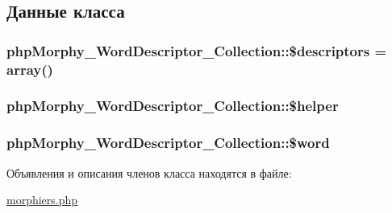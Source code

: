 \subsection{Данные класса}
\hypertarget{classphpMorphy__WordDescriptor__Collection_a9809563bf571bc19b2b13eecfd8e8017}{
\subsubsection[{\$descriptors}]{\setlength{\rightskip}{0pt plus 5cm}phpMorphy\_\-WordDescriptor\_\-Collection::\$descriptors = array()}}
\label{classphpMorphy__WordDescriptor__Collection_a9809563bf571bc19b2b13eecfd8e8017}
\hypertarget{classphpMorphy__WordDescriptor__Collection_ab5db98053fa20be5134c60341a0cbfca}{
\subsubsection[{\$helper}]{\setlength{\rightskip}{0pt plus 5cm}phpMorphy\_\-WordDescriptor\_\-Collection::\$helper}}
\label{classphpMorphy__WordDescriptor__Collection_ab5db98053fa20be5134c60341a0cbfca}
\hypertarget{classphpMorphy__WordDescriptor__Collection_a4853ae116ecd94e3d46e98ee933479cf}{
\subsubsection[{\$word}]{\setlength{\rightskip}{0pt plus 5cm}phpMorphy\_\-WordDescriptor\_\-Collection::\$word}}
\label{classphpMorphy__WordDescriptor__Collection_a4853ae116ecd94e3d46e98ee933479cf}


Объявления и описания членов класса находятся в файле:\begin{DoxyCompactItemize}
\item 
\hyperlink{morphiers_8php}{morphiers.php}\end{DoxyCompactItemize}
